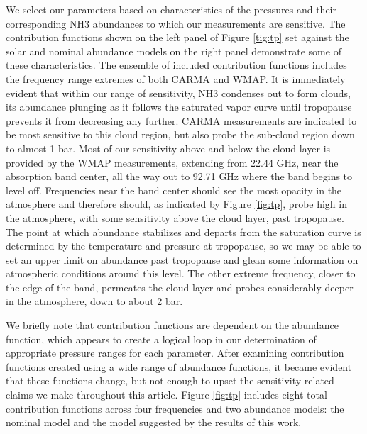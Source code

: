 \documentclass{article}
\begin{document}
	We select our parameters based on characteristics of the pressures and their corresponding NH3 abundances to which our measurements are sensitive.
	The contribution functions shown on the left panel of Figure \ref{tig:tp} set against the solar and nominal abundance models on the right panel demonstrate some of these characteristics.
	The ensemble of included contribution functions includes the frequency range extremes of both CARMA and WMAP.
	It is immediately evident that within our range of sensitivity, NH3 condenses out to form clouds, its abundance plunging as it follows the saturated vapor curve until tropopause prevents it from decreasing any further.
	CARMA measurements are indicated to be most sensitive to this cloud region, but also probe the sub-cloud region down to almost 1 bar.
	Most of our sensitivity above and below the cloud layer is provided by the WMAP measurements, extending from 22.44 GHz, near the absorption band center, all the way out to 92.71 GHz where the band begins to level off.
	Frequencies near the band center should see the most opacity in the atmosphere and therefore should, as indicated by Figure \ref{fig:tp}, probe high in the atmosphere, with some sensitivity above the cloud layer, past tropopause.
	The point at which abundance stabilizes and departs from the saturation curve is determined by the temperature and pressure at tropopause, so we may be able to set an upper limit on abundance past tropopause and glean some information on atmospheric conditions around this level.
	The other extreme frequency, closer to the edge of the band, permeates the cloud layer and probes considerably deeper in the atmosphere, down to about 2 bar.

	We briefly note that contribution functions are dependent on the abundance function, which appears to create a logical loop in our determination of appropriate pressure ranges for each parameter.
	After examining contribution functions created using a wide range of abundance functions, it became evident that these functions change, but not enough to upset the sensitivity-related claims we make throughout this article.
	Figure \ref{fig:tp} includes eight total contribution functions across four frequencies and two abundance models: the nominal model and the model suggested by the results of this work.
\end{document}

